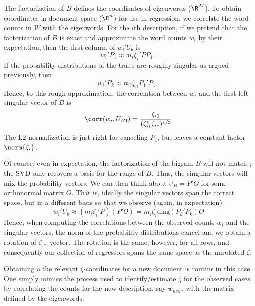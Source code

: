 \documentclass[12pt]{article}
\begin{document}
 The factorization of $B$ defines the coordinates of eigenwords ($\R^M$).  To
 obtain coordinates in document space ($\R^n$) for use in regression, we  correlate  the word counts in $W$ with the eigenwords.  For the $i$th description, if we pretend that the factorization of $B$ is exact and approximate the word counts $w_i$ by their expectation, then the first column of $w_i' U_b$ is
 \begin{displaymath}
    w_i'P_1 \approx m_i \zeta_i' P P_1 \;.
 \end{displaymath}
 If the probability distributions of the traits are roughly singular as argued previously, then
 \begin{displaymath}
    w_i'P_k \approx m_i \zeta_{i1} P_1'P_1 \;.
 \end{displaymath}
 Hence, to this rough approximation, the correlation between $w_i$ and the first
 left singular vector of $B$ is
 \begin{displaymath}
    \corr(w_i, U_{B1}) = \frac{\zeta_{i1}}{(\zeta_{i*}'\zeta_{i*})^{1/2}}   
 \end{displaymath}
 The L2 normalization is just right for canceling $P_1$, but leaves a constant
 factor $\norm{\zeta_i}$.

 
 Of course, even in expectation, the factorization of the bigram $B$ will not
 match  ; the SVD  only recovers a basis for the range of $B$.  Thus, the 
 singular vectors will mix the probability vectors.  We can
 then think about $U_B = P'O$ for some orthonormal matrix $O$.  That is, ideally
 the singular vectors span the correct space, but in a different basis so that
 we observe (again, in expectation)
 \begin{displaymath}
   w_i'U_b \approx (m_i \zeta_i'P)(P'O) = m_i \zeta_i \mbox{diag}(P_k'P_k) O
 \end{displaymath}
 Hence, when computing the correlations between the observed counts $w_i$ and the
 singular vectors, the norm of the probability distributions cancel and we
 obtain a rotation of  $\zeta_{i*}$ vector.  The rotation is the same, however,
 for all rows, and consequently our collection of regressors spans the same
 space as the unrotated $\zeta$.


 Obtaining a the relevant $\zeta$-coordinates for a new document is routine in
 this case.  One simply mimics the process used to identify/estimate $\zeta$ for
 the observed cases by correlating the counts for the new description, say
 $w_{new}$, with the matrix defined by the eigenwords.
\end{document}
